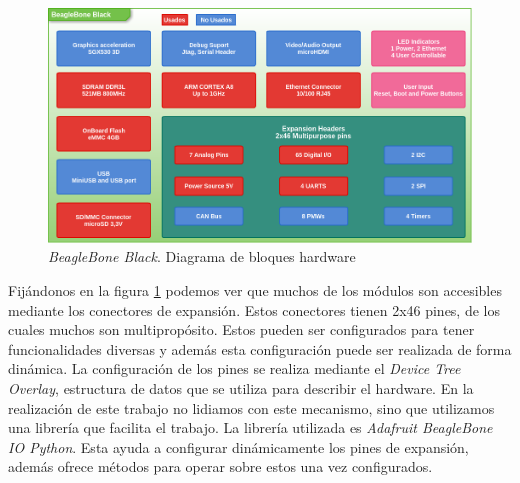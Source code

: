 	\begin{figure}[h]
		\centering
		\includegraphics[keepaspectratio, width=1\textwidth]{./img/beaglebone.png}
		\caption{\emph{BeagleBone Black}. Diagrama de bloques hardware}
		\label{fig:beaglebone}
	\end{figure}
	\par
	Fijándonos en la figura \ref{fig:beaglebone} podemos ver que muchos de los módulos son accesibles mediante los conectores de
	expansión\cite{BeagleWikiExp}. Estos conectores tienen 2x46 pines, de los cuales muchos son multipropósito. Estos pueden ser configurados para tener
	funcionalidades diversas y además esta configuración puede ser realizada de forma dinámica. La configuración de los pines se realiza mediante
	el \emph{Device Tree Overlay}, estructura de datos que se utiliza para describir el hardware. En la realización de este trabajo no lidiamos
	con este mecanismo, sino que utilizamos una librería que facilita el trabajo. La librería utilizada es \emph{Adafruit BeagleBone IO
	Python}\cite{AdaFruitGit}. Esta ayuda a configurar dinámicamente los pines de expansión, además ofrece métodos para
	operar sobre estos una vez configurados.

